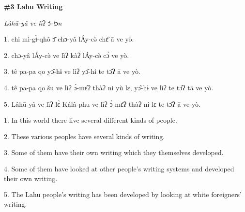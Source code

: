 
\textbf{\#3 Lahu Writing}

\textit{Lâhū-yâ ve lì}ʔ\textit{ }ɔ\textit{̀-l}ɔ\textit{n}

1. chi mì-gɨ̀-qhô ɔ̄ chɔ-yâ lÁy-cə̀ chɛ̂ ā ve yò.

2. chɔ-yâ lÁy-cə̀ ve lìʔ kàʔ lÁy-cə̀ cɔ̀ ve yò.

3. tê pa-pa qo yɔ̂-hɨ ve lìʔ yɔ̂-hɨ te tɔ̂ʔ ā ve yò.

4. tê pa-pa qo šu ve lìʔ ɔ̀-mɛ̂ʔ thàʔ ni yù lɛ, yɔ̂-hɨ ve lìʔ
te tɔ̂ʔ tā ve yò.

5. Lâhū-yâ ve lìʔ lɛ̀ Kâlâ-phu ve lìʔ ɔ̀-mɛ̂ʔ thàʔ ni lɛ te
tɔ̂ʔ ā ve yò.

1. In this world there live several different kinds of people.

2. These various peoples have several kinds of writing.

3. Some of them have their own writing which they themselves developed.

4. Some of them have looked at other people's writing systems and developed their
own writing.

5. The Lahu people's writing has been developed by looking at white foreigners'
writing.


